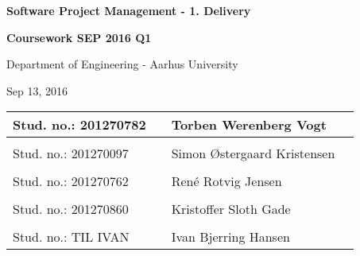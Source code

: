 
\centerline{\Huge\bfseries\color{ThemeColor} Software Project Management - 1. Delivery}

\vspace{1em}
\centerline{\Large\bfseries\color{BlackColor} Coursework SEP 2016 Q1}



\vspace{5em}
\centerline{\large\bfseries\color{BlackColor}}
\centerline{\large\color{BlackColor}Department of Engineering - Aarhus University}

\vspace{0.5em}
\centerline{\large\color{BlackColor} Sep 13, 2016}

\vspace{25em}

\begin{center}
   \begin{tabular}{ l p{3cm} l l }
   Stud. no.: 201270782 && Torben Werenberg Vogt & \\\hline
   & & \\
   Stud. no.: 201270097 && Simon Østergaard Kristensen & \\\hline
   & & \\
   Stud. no.: 201270762 && René Rotvig Jensen & \\\hline
   & & \\
   Stud. no.: 201270860 && Kristoffer Sloth Gade & \\\hline
  & & \\
   Stud. no.:  TIL IVAN &&  Ivan Bjerring Hansen & \\\hline
   \end{tabular}
\end{center}
\thispagestyle{empty} %
\restoregeometry

